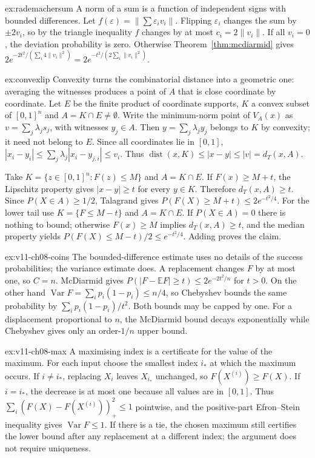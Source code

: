 \begin{solution}{ex:rademachersum}
\idea A norm of a sum is a function of independent signs with bounded differences.
\writeup Let $f(\varepsilon)=\|\sum\varepsilon_iv_i\|$. Flipping $\varepsilon_i$ changes the sum by $\pm2v_i$, so by the triangle inequality $f$ changes by at most $c_i=2\|v_i\|$. If all $v_i=0$, the deviation probability is zero. Otherwise Theorem~\ref{thm:mcdiarmid} gives $2e^{-2t^2/(\sum_i4\|v_i\|^2)}=2e^{-t^2/(2\sum_i\|v_i\|^2)}$.
\end{solution}

\begin{solution}{ex:convexlip}
\idea Convexity turns the combinatorial distance into a geometric one: averaging the witnesses produces a point of $A$ that is close coordinate by coordinate.
\writeup Let $E$ be the finite product of coordinate supports, $K$ a convex subset of $[0,1]^n$ and $A=K\cap E\ne\emptyset$. Write the minimum-norm point of $V_A(x)$ as $v=\sum_j\lambda_js_j$, with witnesses $y_j\in A$. Then $y=\sum_j\lambda_jy_j$ belongs to $K$ by convexity; it need not belong to $E$. Since all coordinates lie in $[0,1]$, $|x_i-y_i|\le\sum_j\lambda_j|x_i-y_{j,i}|\le v_i$. Thus $\operatorname{dist}(x,K)\le|x-y|\le|v|=d_T(x,A)$.

Take $K=\{z\in[0,1]^n:F(z)\le M\}$ and $A=K\cap E$. If $F(x)\ge M+t$, the Lipschitz property gives $|x-y|\ge t$ for every $y\in K$. Therefore $d_T(x,A)\ge t$. Since $P(X\in A)\ge1/2$, Talagrand gives $P(F(X)\ge M+t)\le2e^{-t^2/4}$. For the lower tail use $K=\{F\le M-t\}$ and $A=K\cap E$. If $P(X\in A)=0$ there is nothing to bound; otherwise $F(x)\ge M$ implies $d_T(x,A)\ge t$, and the median property yields $P(F(X)\le M-t)/2\le e^{-t^2/4}$. Adding proves the claim.
\end{solution}

\begin{solution}{ex:v11-ch08-coins}
\idea The bounded-difference estimate uses no details of the success probabilities; the variance estimate does.
\writeup A replacement changes $F$ by at most one, so $C=n$. McDiarmid gives $P(|F-\mathbb EF|\ge t)\le2e^{-2t^2/n}$ for $t>0$. On the other hand $\operatorname{Var}F=\sum_i p_i(1-p_i)\le n/4$, so Chebyshev bounds the same probability by $\sum_i p_i(1-p_i)/t^2$. Both bounds may be capped by one. For a displacement proportional to $n$, the McDiarmid bound decays exponentially while Chebyshev gives only an order-$1/n$ upper bound.
\end{solution}

\begin{solution}{ex:v11-ch08-max}
\idea A maximising index is a certificate for the value of the maximum.
\writeup For each input choose the smallest index $i_*$ at which the maximum occurs. If $i\ne i_*$, replacing $X_i$ leaves $X_{i_*}$ unchanged, so $F(X^{(i)})\ge F(X)$. If $i=i_*$, the decrease is at most one because all values are in $[0,1]$. Thus $\sum_i(F(X)-F(X^{(i)}))_+^2\le1$ pointwise, and the positive-part Efron--Stein inequality gives $\operatorname{Var}F\le1$. If there is a tie, the chosen maximum still certifies the lower bound after any replacement at a different index; the argument does not require uniqueness.
\end{solution}

